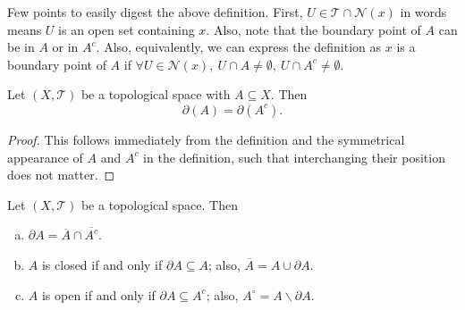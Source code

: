 Few points to easily digest the above definition. First, $U \in \mathcal{T} \cap \mathcal{N}(x)$ in words means $U$ is an open set containing $x$. Also, note that the boundary point of $A$ can be in $A$ or in $A^c$. Also, equivalently, we can express the definition as $x$ is a boundary point of $A$ if $\forall U\in \mathcal{N}(x),\ U \cap A \neq \emptyset,\ U \cap A^c \neq \emptyset$. 

\begin{corollary}
	Let $(X,\mathcal{T})$ be a topological space with $A \subseteq X$. Then 
	\[ \partial (A) = \partial (A^c). \]
\end{corollary}
\begin{proof}
	This follows immediately from the definition and the symmetrical appearance of $A$ and $A^c$ in the definition, such that interchanging their position does not matter.
\end{proof}

\begin{proposition}
	Let $(X,\mathcal{T})$ be a topological space. Then 
	\begin{enumerate}[(a)]
		\item $\partial A = \overline{A} \cap \overline{A^c}$.
		\item $A$ is closed if and only if $\partial A \subseteq A$; also, $\overline{A} = A \cup \partial A$.
		\item $A$ is open if and only if $\partial A \subseteq A^c$; also, $A^\circ = A \backslash \partial A$.
	\end{enumerate}
\end{proposition}

